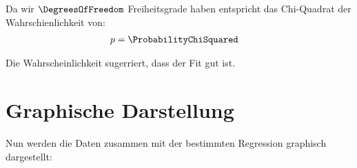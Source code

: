 \documentclass[11pt]{article}
\begin{document}
        Da wir $\DegreesOfFreedom$ Freiheitsgrade haben entspricht das Chi-Quadrat der Wahrschienlichkeit von:
        \begin{align*}
            p &= \ProbabilityChiSquared
        \end{align*}

        Die Wahrscheinlichkeit sugerriert, dass der Fit gut ist.

        \section{Graphische Darstellung}

       Nun werden die Daten zusammen mit der bestimmten Regression graphisch dargestellt:

        


    
\end{document}
